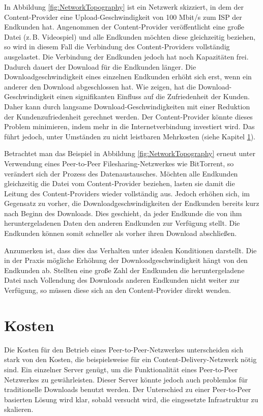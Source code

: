 In Abbildung \ref{fig:NetworkTopography} ist ein Netzwerk skizziert, in dem der Con\-tent-Provider eine Upload-Geschwindigkeit von 100 Mbit/s zum ISP der Endkunden hat. Angenommen der Con\-tent-Provider veröffentlicht eine große Datei (z.\,B. Videospiel) und alle Endkunden möchten diese gleichzeitig beziehen, so wird in diesem Fall die Verbindung des Con\-tent-Providers vollständig ausgelastet. Die Verbindung der Endkunden jedoch hat noch Kapazitäten frei. Dadurch dauert der Download für die Endkunden länger. Die Downloadgeschwindigkeit eines einzelnen Endkunden erhöht sich erst, wenn ein anderer den Download abgeschlossen hat. Wie \textcite{kim2007impact} zeigen, hat die Download-Geschwindigkeit einen signifikanten Einfluss auf die Zufriedenheit der Kunden. Daher kann durch langsame Download-Geschwindigkeiten mit einer Reduktion der Kundenzufriedenheit gerechnet werden. Der Content-Provider könnte dieses Problem minimieren, indem mehr in die Internetverbindung investiert wird. Das führt jedoch, unter Umständen zu nicht leistbaren Mehrkosten (siehe Kapitel \ref{sec:VergleichKosten}). 

Betrachtet man das Beispiel in Abbildung \ref{fig:NetworkTopography} erneut unter Verwendung eines Peer-to-Peer Filesharing-Netzwerkes wie BitTorrent, so verändert sich der Prozess des Datenaustausches. Möchten alle Endkunden gleichzeitig die Datei vom Content-Provider beziehen, lasten sie damit die Leitung des Content-Providers wieder vollständig aus. Jedoch erhöhen sich, im Gegensatz zu vorher, die Downloadgeschwindigkeiten der Endkunden bereits kurz nach Beginn des Downloads. Dies geschieht, da jeder Endkunde die von ihm heruntergeladenen Daten den anderen Endkunden zur Verfügung stellt. Die Endkunden können somit schneller als vorher ihren Download abschließen. 

Anzumerken ist, dass dies das Verhalten unter idealen Konditionen darstellt. Die in der Praxis mögliche Erhöhung der Downloadgeschwindigkeit hängt von den Endkunden ab. Stellten eine große Zahl der Endkunden die heruntergeladene Datei nach Vollendung des Downloads anderen Endkunden nicht weiter zur Verfügung, so müssen diese sich an den Content-Provider direkt wenden. 


\section{Kosten}
\label{sec:VergleichKosten}
 Die Kosten für den Betrieb eines Peer-to-Peer-Netzwerkes unterscheiden sich stark von den Kosten, die beispielsweise für ein Content-Delivery-Netzwerk nötig sind. Ein einzelner Server genügt, um die Funktionalität eines Peer-to-Peer Netzwerkes zu gewährleisten. Dieser Server könnte jedoch auch problemlos für traditionelle Downloads benutzt werden. Der Unterschied zu einer Peer-to-Peer basierten Lösung wird klar, sobald versucht wird, die eingesetzte Infrastruktur zu skalieren. 
 

